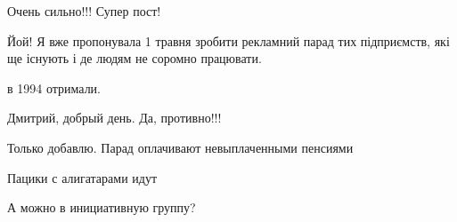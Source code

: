 \begin{itemize}
Очень сильно!!! Супер пост!

 
Йой! Я вже пропонувала 1 травня зробити рекламний парад тих підприємств, які ще існують і де людям не соромно працювати.

 
в 1994 отримали.

 
Дмитрий, добрый день. Да, противно!!!

 
Только добавлю. Парад оплачивают невыплаченными пенсиями

 
Пацики с алигатарами идут 🤘🤣😆

 
А можно в инициативную группу?

 

\end{itemize}
